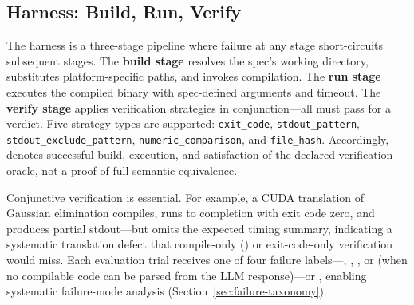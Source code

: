 \subsection{Harness: Build, Run, Verify}
\label{sec:harness}

The harness is a three-stage pipeline where failure at any stage short-circuits subsequent stages. The \textbf{build stage} resolves the spec's working directory, substitutes platform-specific paths, and invokes compilation. The \textbf{run stage} executes the compiled binary with spec-defined arguments and timeout. The \textbf{verify stage} applies verification strategies in conjunction---all must pass for a \pass{} verdict. Five strategy types are supported: \texttt{exit\_code}, \texttt{stdout\_pattern}, \texttt{stdout\_exclude\_pattern}, \texttt{numeric\_comparison}, and \texttt{file\_hash}. Accordingly, \pass{} denotes successful build, execution, and satisfaction of the declared verification oracle, not a proof of full semantic equivalence.

Conjunctive verification is essential. For example, a CUDA translation of Gaussian elimination compiles, runs to completion with exit code zero, and produces partial stdout---but omits the expected timing summary, indicating a systematic translation defect that compile-only (\cite{CodeRosetta2024}) or exit-code-only verification would miss. Each evaluation trial receives one of four failure labels---\buildfail{}, \runfail{}, \verifyfail{}, or \extractionfail{} (when no compilable code can be parsed from the LLM response)---or \pass{}, enabling systematic failure-mode analysis (Section~\ref{sec:failure-taxonomy}).
